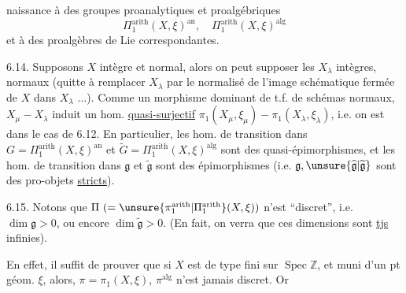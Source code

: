 naissance à des groupes proanalytiques et proalgébriques
\[
\Pi_1^{\mathrm{arith}}(X,\xi)^{\mathrm{an}},\quad
\Pi_1^{\mathrm{arith}}(X,\xi)^{\mathrm{alg}}
\]
et à des proalgèbres de Lie correspondantes.

6.14. Supposons $X$ intègre et normal, alors on peut supposer les
$X_\lambda$ intègres, normaux (quitte à  remplacer $X_\lambda$
par le normalisé de l'image schématique fermée de $X$ dans $X_\lambda$
$\ldots$). 
Comme un  morphisme dominant de t.f. de schémas normaux,
$X_\mu\mathbin{-}X_\lambda$ induit un  hom.
\uline{quasi-surjectif}
$\pi_1(X_\mu,\xi_\mu)\mathbin{-}\pi_1(X_\lambda,\xi_\lambda)$,
i.e. on est dans le cas de 6.12. En particulier, les  hom.
de transition dans \deleted{$\unsure{\Pi}$}
$G=\Pi_1^{\mathrm{arith}}(X,\xi)^{\mathrm{an}}$ et
$\widetilde{G}=\Pi_1^{\mathrm{arith}}(X,\xi)^{\mathrm{alg}}$ sont des
quasi-épimorphismes, et les hom. de transition dans $\mathfrak{g}$ et
$\widetilde{\mathfrak{g}}$ sont des épimorphismes (i.e.
$\mathfrak{g},\unsure{\widehat{\mathfrak{g}}|\widetilde{\mathfrak{g}}}$
sont des pro-objets \uline{stricts}).

6.15. Notons que 
$\Pi\ (=\unsure{\pi_1^{\mathrm{arith}}|\Pi_1^{\mathrm{arith}}}(X,\xi))$
n'est  ``discret'', i.e.
 $\dim\mathfrak{g}>0$,
 ou encore
$\dim\widetilde{\mathfrak{g}}>0$. (En fait, on verra que ces dimensions
sont \uline{tjs} infinies).

En effet, il suffit de prouver que si 
$X$ est de type fini sur $\operatorname{Spec}\mathbb{Z}$, et muni d'un
pt géom. $\xi$,  alors,
 
$\pi=\pi_1(X,\xi)$, $\pi^{\mathrm{alg}}$ n'est jamais discret. Or
